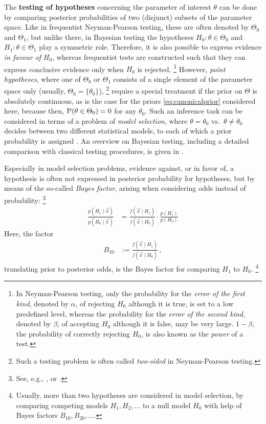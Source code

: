 The \textbf{testing of hypotheses} concerning the parameter of interest $\theta$ can be done
by comparing posterior probabilities of two (disjunct) subsets of the parameter space.
Like in frequentist Neyman-Pearson testing, these are often denoted by $\Theta_0$ and $\Theta_1$,
but unlike there, in Bayesian testing the hypotheses $H_0: \theta \in \Theta_0$ and $H_1: \theta \in \Theta_1$ play a symmetric role.
Therefore, it is also possible to express evidence \emph{in favour of} $H_0$,
whereas frequentist tests are constructed such that they can express conclusive evidence only when $H_0$ is rejected.%
\footnote{In Neyman-Pearson testing, only the probability
for the \emph{error of the first kind}, denoted by $\alpha$, of rejecting $H_0$ although it is true, is set to a low predefined level,
whereas the probability for the \emph{error of the second kind}, denoted by $\beta$, of accepting $H_0$ although it is false, may be very large.
$1-\beta$, the probability of correctly rejecting $H_0$, is also known as the \emph{power} of a test.}
However, \emph{point hypotheses}, where one of $\Theta_0$ or $\Theta_1$
consists of a single element of the parameter space only (usually, $\Theta_0 = \{\theta_0\}$),%
\footnote{Such a testing problem is often called \emph{two-sided} in Neyman-Pearson testing.}
require a special treatment if the prior on $\Theta$ is absolutely continuous,
as is the case for the priors \eqref{eq:canonicalprior} considered here,
because then, $\operatorname{P}(\theta \in \Theta_0) = 0$ for any $\theta_0$.
Such an inference task can be considered in terms of a problem of \emph{model selection},
where $\theta = \theta_0$ vs.\ $\theta \neq \theta_0$ decides between two different statistical models,
to each of which a prior probability is assigned \parencite[e.g.,][\S 5.2.4]{2007:robert}.
An overview on Bayesian testing, including a detailed comparison with classical testing procedures,
is given in \textcite[\S 5.2--5.4]{2007:robert}.

Especially in model selection problems, evidence against, or in favor of, a hypothesis
is often not expressed in posterior probability for hypotheses, but by means of the so-called \emph{Bayes factor},
arising when considering odds instead of probability:%
\footnote{See, e.g., \textcite[\S 5.2.2, Def.~5.2.5, p.~227]{2007:robert}, or \textcite[p.~776]{1995:kass-raftery}.}
\begin{align*}
\frac{p(H_1\mid\vec{x})}{p(H_0\mid\vec{x})} &= \frac{f(\vec{x}\mid H_1)}{f(\vec{x}\mid H_0)} \cdot \frac{p(H_1)}{p(H_0)}
\end{align*}
Here, the factor
\begin{align*}
B_{10} &:= \frac{f(\vec{x}\mid H_1)}{f(\vec{x}\mid H_0)}\,,
\end{align*}
translating prior to posterior odds, is the Bayes factor for comparing $H_1$ to $H_0$.%
\footnote{Usually, more than two hypotheses are considered in model selection,
by comparing competing models $H_1, H_2, \ldots$ to a null model $H_0$
with help of Bayes factors $B_{10}, B_{20}, \ldots$.}

